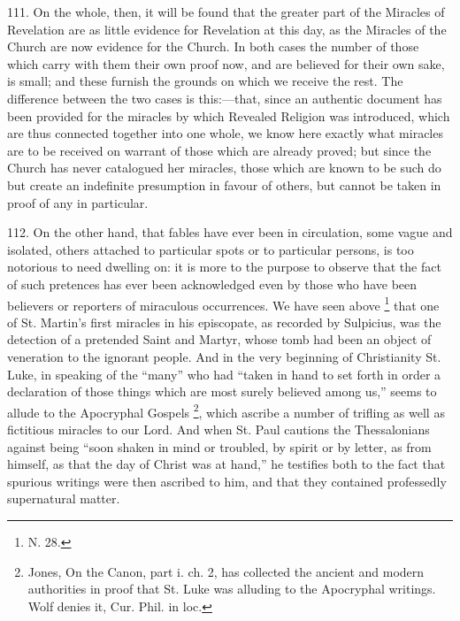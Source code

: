 111.
On the whole, then, it will be found that the greater part of the
Miracles of Revelation are as little evidence for Revelation at this
day, as the Miracles of the Church are now evidence for the
Church. In both cases the number of those which carry with them their
own proof now, and are believed for their own sake, is small; and
these furnish the grounds on which we receive the rest. The difference
between the two cases is this:—that, since an authentic document has
been provided for the miracles by which Revealed Religion was
introduced, which are thus connected together into one whole, we know
here exactly what miracles are to be received on warrant of those
which are already proved; but since the Church has never catalogued
her miracles, those which are known to be such do but create an
indefinite presumption in favour of others, but cannot be taken in
proof of any in particular.

112.
On the other hand, that fables have ever been in circulation, some
vague and isolated, others attached to particular spots or to
particular persons, is too notorious to need dwelling on: it is more
to the purpose to observe that the fact of such pretences has ever
been acknowledged even by those who have been believers or reporters
of miraculous occurrences. We have seen above \footnote{N. 28.} that one of St. Martin's first miracles in his episcopate, as
recorded by Sulpicius, was the detection of a pretended Saint and
Martyr, whose tomb had been an object of veneration to the ignorant
people. And in the very beginning of Christianity St. Luke, in
speaking of the ``many'' who had ``taken in hand to set forth in order a declaration of those things which are most surely believed
among us,'' seems to allude to the Apocryphal Gospels \footnote{Jones, On the Canon, part i. ch. 2, has collected the ancient and
modern authorities in proof that St. Luke was alluding to the
Apocryphal writings. Wolf denies it, Cur. Phil. in loc.}, which ascribe a number of trifling as well as fictitious
miracles to our Lord. And when St. Paul cautions the Thessalonians
against being ``soon shaken in mind or troubled, by spirit or by
letter, as from himself, as that the day of Christ was at hand,'' he
testifies both to the fact that spurious writings were then ascribed
to him, and that they contained professedly supernatural matter.

